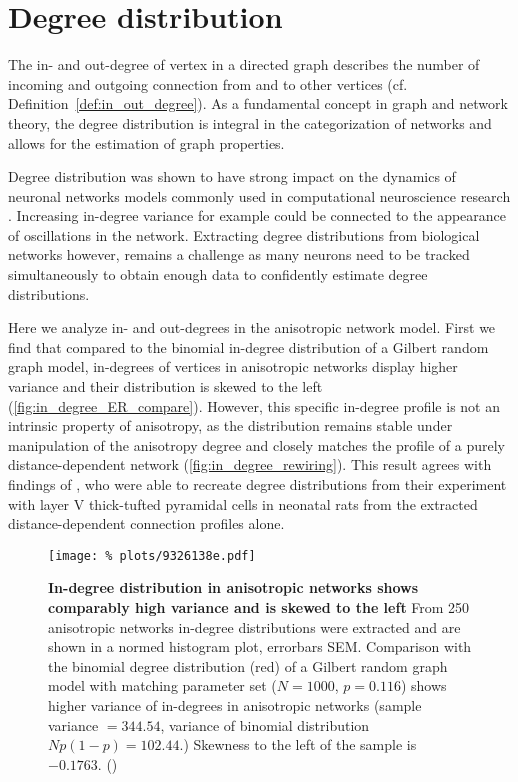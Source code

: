 
\section{Degree distribution}\label{sec:degree_distribution}

The in- and out-degree of vertex in a directed graph describes the
number of incoming and outgoing connection from and to other vertices
(cf. Definition~\ref{def:in_out_degree}). As a fundamental concept in
graph and network theory, the degree distribution is integral in the
categorization of networks and allows for the estimation of graph
properties.

Degree distribution was shown to have strong impact on the dynamics of
neuronal networks models commonly used in computational neuroscience
research \parencite{Roxin2011}. Increasing in-degree variance for
example could be connected to the appearance of oscillations in the
network. Extracting degree distributions from biological networks
however, remains a challenge as many neurons need to be tracked
simultaneously to obtain enough data to confidently estimate degree
distributions. 

Here we analyze in- and out-degrees in the anisotropic network
model. First we find that compared to the binomial in-degree
distribution of a Gilbert random graph model, in-degrees of vertices
in anisotropic networks display higher variance and their distribution
is skewed to the left (\autoref{fig:in_degree_ER_compare}). However,
this specific in-degree profile is not an intrinsic property of
anisotropy, as the distribution remains stable under manipulation of
the anisotropy degree and closely matches the profile of a purely
distance-dependent network (\autoref{fig:in_degree_rewiring}). This
result agrees with findings of \textcite[Fig. S3]{Perin2011}, who were
able to recreate degree distributions from their experiment with layer
V thick-tufted pyramidal cells in neonatal rats from the extracted
distance-dependent connection profiles alone.

\begin{figure}[H]
  \centering
  \texttt{[image: \%
    plots/9326138e.pdf]}
  \caption{\textbf{In-degree distribution in anisotropic networks
      shows comparably high variance and is skewed to the left} From 250
    anisotropic networks in-degree distributions were extracted and
    are shown in a normed histogram plot, errorbars SEM. Comparison with the
    binomial degree distribution (red) of a Gilbert random graph model
    with matching parameter set ($N=1000$, $p =0.116$) shows higher
    variance of in-degrees in anisotropic networks (sample variance $=
    344.54$, variance of binomial distribution $Np(1-p) = 102.44$.)
    Skewness to the left of the sample is $-0.1763.$
    ()}
  \label{fig:in_degree_ER_compare}
\end{figure}

